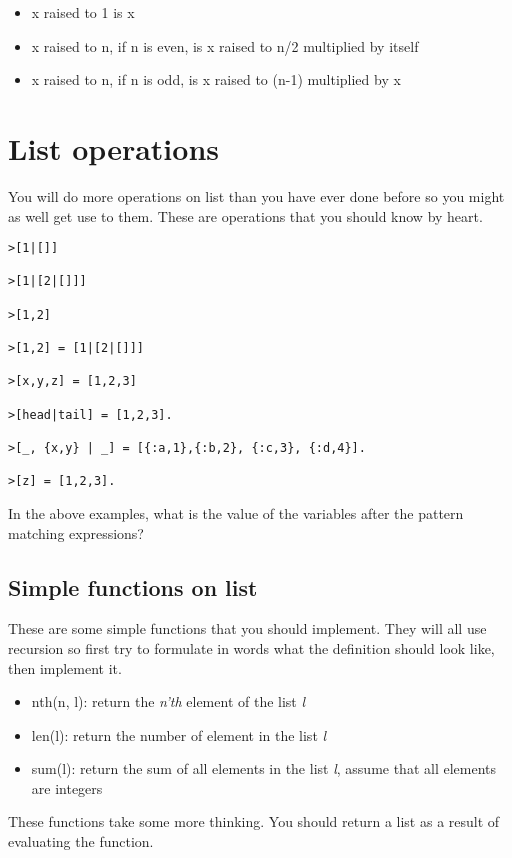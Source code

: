 \documentclass[a4paper,11pt]{article}
\begin{document}
\begin{itemize}
  \item x raised to 1 is x
  \item x raised to n, if n is even, is x raised to n/2 multiplied by itself
  \item x raised to n, if n is odd, is x raised to (n-1) multiplied by x
\end{itemize}


\section{List operations}

You will do more operations on list than you have ever done before so
you might as well get use to them. These are operations that you should
know by heart.

\begin{verbatim}
>[1|[]]

>[1|[2|[]]]

>[1,2]

>[1,2] = [1|[2|[]]]

>[x,y,z] = [1,2,3]

>[head|tail] = [1,2,3].

>[_, {x,y} | _] = [{:a,1},{:b,2}, {:c,3}, {:d,4}].

>[z] = [1,2,3].
\end{verbatim}

In the above examples, what is the value of the variables after the
pattern matching expressions?

\subsection{Simple functions on list}

These are some simple functions that you should implement. They will
all use recursion so first try to formulate in words what the
definition should look like, then implement it.

\begin{itemize}
\item nth(n, l): return the {\em n'th} element of the list {\em l}
\item len(l): return the number of element in the list  {\em l}
\item sum(l): return the sum of all elements in the list  {\em l}, assume
  that all elements are integers
\end{itemize}


These functions take some more thinking. You should return a list as a
result of evaluating the function.
\end{document}
